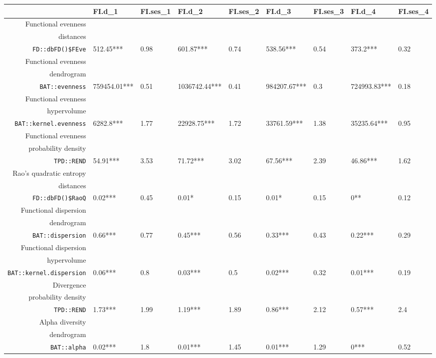 \begin{table}[ht]
\scriptsize
\centering
\begin{tabular}{rllllllll}
  \hline
 & FI.d\_1 & FI.ses\_1 & FI.d\_2 & FI.ses\_2 & FI.d\_3 & FI.ses\_3 & FI.d\_4 & FI.ses\_4 \\ 
  \hline
Functional evenness\\distances\\\texttt{FD::dbFD()\$FEve} & 512.45*** & 0.98 & 601.87*** & 0.74 & 538.56*** & 0.54 & 373.2*** & 0.32 \\ 
  Functional evenness\\dendrogram\\\texttt{BAT::evenness} & 759454.01*** & 0.51 & 1036742.44*** & 0.41 & 984207.67*** & 0.3 & 724993.83*** & 0.18 \\ 
  Functional evenness\\hypervolume\\\texttt{BAT::kernel.evenness} & 6282.8*** & 1.77 & 22928.75*** & 1.72 & 33761.59*** & 1.38 & 35235.64*** & 0.95 \\ 
  Functional evenness\\probability density\\\texttt{TPD::REND} & 54.91*** & 3.53 & 71.72*** & 3.02 & 67.56*** & 2.39 & 46.86*** & 1.62 \\ 
  Rao's quadratic entropy\\distances\\\texttt{FD::dbFD()\$RaoQ} & 0.02*** & 0.45 & 0.01* & 0.15 & 0.01* & 0.15 & 0** & 0.12 \\ 
  Functional dispersion\\dendrogram\\\texttt{BAT::dispersion} & 0.66*** & 0.77 & 0.45*** & 0.56 & 0.33*** & 0.43 & 0.22*** & 0.29 \\ 
  Functional dispersion\\hypervolume\\\texttt{BAT::kernel.dispersion} & 0.06*** & 0.8 & 0.03*** & 0.5 & 0.02*** & 0.32 & 0.01*** & 0.19 \\ 
  Divergence\\probability density\\\texttt{TPD::REND} & 1.73*** & 1.99 & 1.19*** & 1.89 & 0.86*** & 2.12 & 0.57*** & 2.4 \\ 
  Alpha diversity\\dendrogram\\\texttt{BAT::alpha} & 0.02*** & 1.8 & 0.01*** & 1.45 & 0.01*** & 1.29 & 0*** & 0.52 \\ 

\end{tabular}
\end{table}
